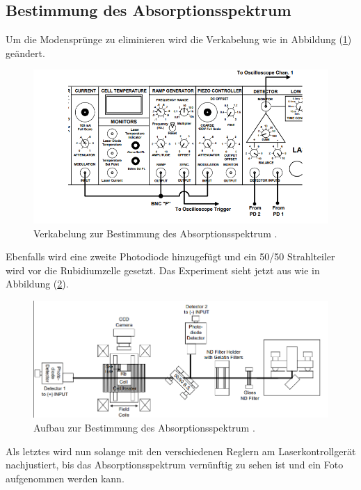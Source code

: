 \subsection{Bestimmung des Absorptionsspektrum}
Um die Modensprünge zu eliminieren wird die Verkabelung wie in Abbildung (\ref{fig:auf4}) geändert.
\begin{figure}[h!]
  \centering
  \includegraphics[scale=0.5]{fig/auf4.png}
  \caption{Verkabelung zur Bestimmung des Absorptionsspektrum \cite[16]{Anleitung4}.}
  \label{fig:auf4}
\end{figure}
\FloatBarrier
\noindent Ebenfalls wird eine zweite Photodiode hinzugefügt und ein 50/50 Strahlteiler wird vor die Rubidiumzelle gesetzt. Das Experiment sieht jetzt aus wie in Abbildung (\ref{fig:auf5}).
\begin{figure}[h!]
  \centering
  \includegraphics[scale=0.5]{fig/auf5.png}
  \caption{Aufbau zur Bestimmung des Absorptionsspektrum \cite[16]{Anleitung4}.}
  \label{fig:auf5}
\end{figure}
\FloatBarrier
\noindent Als letztes wird nun solange mit den verschiedenen Reglern am Laserkontrollgerät nachjustiert, bis das Absorptionsspektrum vernünftig zu sehen ist und ein Foto aufgenommen werden kann.
